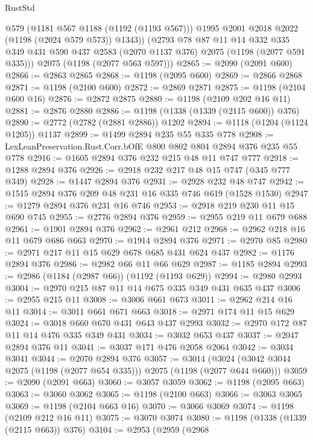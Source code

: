 \begin{lexlean}{RustStd}
\begin{coremodule}
{\begin{coremodule}
{{{{{{{{{          @579
          (@1181 @567 @1188 (@1192 (@1193 @567)))
          @1995
          @2001
          @2018
          @2022
          (@1198 (@2024 @579 @573))
          @1343))
      (@2793
        @78
        @87
        @11
        @14
        @332
        @335
        @349
        @431
        @590
        @437
        @2583
        (@2070 @1137 @376)
        @2075
        (@1198 (@2077 @591 @335)))
      @2075
      (@1198 (@2077 @563 @597)))
@2865 := @2090 (@2091 @600)
@2866 := @2863 @2865
@2868 := @1198 (@2095 @600)
@2869 := @2866 @2868
@2871 := @1198 (@2100 @600)
@2872 := @2869 @2871
@2875 := @1198 (@2104 @600 @16)
@2876 := @2872 @2875
@2880 := @1198 (@2109 @202 @16 @11)
@2881 := @2876 @2880
@2886 := @1198 (@1338 (@1339 (@2115 @600)) @376)
@2890 := @2772 (@2782 (@2881 @2886)) @1202
@2894 := @1118 (@1204 (@1124 @1205)) @1137
@2899 := @1499 @2894 @235 @55 @335 @778
@2908 := LexLeanPreservation.Rust.Corr.bOfE @800 @802 @804 @2894 @376 @235 @55 @778
@2916 := @1605 @2894 @376 @232 @215 @48 @11 @747 @777
@2918 := @1288 @2894 @376
@2926 := @2918 @232 @217 @48 @15 @747 (@345 @777 @349)
@2928 := @1447 @2894 @376
@2931 := @2928 @232 @48 @747
@2942 := @1515 @2894 @376 @209 @48 @231 @16 @335 @746 @619 (@1528 @1530)
@2947 := @1279 @2894 @376 @231 @16 @746
@2953 := @2918 @219 @230 @11 @15 @690 @745
@2955 := @2776 @2894 @376
@2959 := @2955 @219 @11 @679 @688
@2961 := @1901 @2894 @376
@2962 := @2961 @212
@2968 := @2962 @218 @16 @11 @679 @686 @663
@2970 := @1914 @2894 @376
@2971 := @2970 @85
@2980 := @2971 @217 @11 @15 @629 @678 @685 @431 @624 @437
@2982 := @1176 @2894 @376
@2986 := @2982 @66 @11 @66 @629
@2987 := @1185 @2894
@2993 := @2986 (@1184 (@2987 @66)) (@1192 (@1193 @629))
@2994 := @2980 @2993
@3004 := @2970 @215 @87 @11 @14 @675 @335 @349 @431 @635 @437
@3006 := @2955 @215 @11
@3008 := @3006 @661 @673
@3011 := @2962 @214 @16 @11
@3014 := @3011 @661 @671 @663
@3018 := @2971 @174 @11 @15 @629
@3024 := @3018 @660 @670 @431 @643 @437 @2993
@3032 := @2970 @172 @87 @11 @14 @476 @335 @349 @431
@3034 := @3032 @653 @437
@3037 := @2047 @2894 @376 @11
@3041 := @3037 @171 @476 @2058 @2064
@3042 := @3034 @3041
@3044 := @2070 @2894 @376
@3057 := @3014 (@3024 (@3042 @3044 @2075 (@1198 (@2077 @654 @335))) @2075 (@1198 (@2077 @644 @660)))
@3059 := @2090 (@2091 @663)
@3060 := @3057 @3059
@3062 := @1198 (@2095 @663)
@3063 := @3060 @3062
@3065 := @1198 (@2100 @663)
@3066 := @3063 @3065
@3069 := @1198 (@2104 @663 @16)
@3070 := @3066 @3069
@3074 := @1198 (@2109 @212 @16 @11)
@3075 := @3070 @3074
@3080 := @1198 (@1338 (@1339 (@2115 @663)) @376)
@3104 := @2953
    (@2959
      (@2968
}}}}}}}}}
\end{coremodule}}
\end{coremodule}
\end{lexlean}
